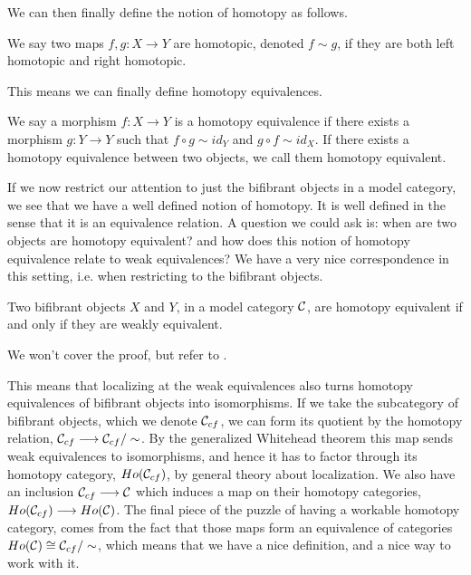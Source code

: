 We can then finally define the notion of homotopy as follows. 

\begin{definition}
\label{def:homotopic_maps}
We say two maps $f,g:X\longrightarrow Y$ are homotopic, denoted $f\sim g$, if they are both left homotopic and right homotopic.
\end{definition}

This means we can finally define homotopy equivalences. 

\begin{definition}
\label{def:homotopy_equivalence}
We say a morphism $f\colon X\longrightarrow Y$ is a homotopy equivalence if there exists a morphism $g\colon Y\longrightarrow Y$ such that $f\circ g \sim id_Y$ and $g\circ f \sim id_X$. If there exists a homotopy equivalence between two objects, we call them homotopy equivalent.
\end{definition}

If we now restrict our attention to just the bifibrant objects in a model category, we see that we have a well defined notion of homotopy. It is well defined in the sense that it is an equivalence relation. A question we could ask is: when are two objects are homotopy equivalent? and how does this notion of homotopy equivalence relate to weak equivalences? We have a very nice correspondence in this setting, i.e. when restricting to the bifibrant objects. 

\begin{theorem}
\label{thm:whitehead}
Two bifibrant objects $X$ and $Y$, in a model category $\mathcal{C}$, are homotopy equivalent if and only if they are weakly equivalent. 
\end{theorem}

We won't cover the proof, but refer to \cite[Theorem 1.2.10.]{hovey}. 

This means that localizing at the weak equivalences also turns homotopy equivalences of bifibrant objects into isomorphisms. If we take the subcategory of bifibrant objects, which we denote $\mathcal{C}_{cf}$, we can form its quotient by the homotopy relation, $\mathcal{C}_{cf}\longrightarrow \mathcal{C}_{cf}/\sim$. By the generalized Whitehead theorem this map sends weak equivalences to isomorphisms, and hence it has to factor through its homotopy category, $Ho(\mathcal{C}_{cf})$, by general theory about localization. We also have an inclusion $\mathcal{C}_{cf} \longrightarrow \mathcal{C}$ which induces a map on their homotopy categories, $Ho(\mathcal{C}_{cf})\longrightarrow Ho(\mathcal{C})$. The final piece of the puzzle of having a workable homotopy category, comes from the fact that those maps form an equivalence of categories $Ho(\mathcal{C})\cong \mathcal{C}_{cf}/\sim$, which means that we have a nice definition, and a nice way to work with it.











